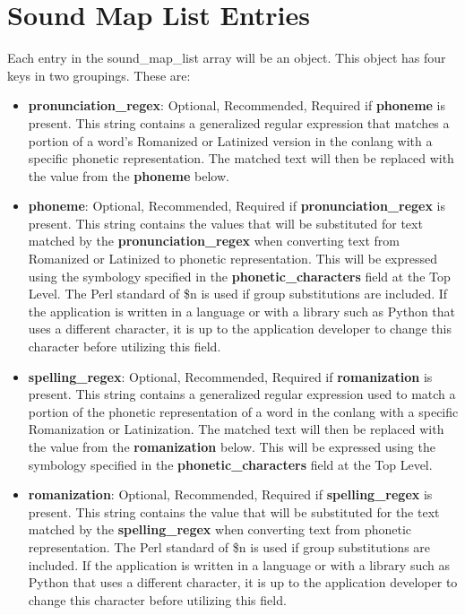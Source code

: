 \chapter{Sound Map List Entries}
Each entry in the sound\_map\_list array will be an object.  This object has four keys in two groupings.  These are:
\begin{itemize}
	\item \textbf{pronunciation\_regex}: Optional, Recommended, Required if \textbf{phoneme} is present.  This string contains a generalized regular expression that matches a portion of a word's Romanized or Latinized version in the conlang with a specific phonetic representation.  The matched text will then be replaced with the value from the \textbf{phoneme} below.
	\item \textbf{phoneme}: Optional, Recommended, Required if \textbf{pronunciation\_regex} is present.  This string contains the values that will be substituted for text matched by the \textbf{pronunciation\_regex} when converting text from Romanized or Latinized to phonetic representation.  This will be expressed using the symbology specified in the \textbf{phonetic\_characters} field at the Top Level.  The Perl standard of \$n is used if group substitutions are included.  If the application is written in a language or with a library such as Python that uses a different character, it is up to the application developer to change this character before utilizing this field.
	\item \textbf{spelling\_regex}: Optional, Recommended, Required if \textbf{romanization} is present.  This string contains a generalized regular expression used to match a portion of the phonetic representation of a word in the conlang with a specific Romanization or Latinization.  The matched text will then be replaced with the value from the \textbf{romanization} below.  This will be expressed using the symbology specified in the \textbf{phonetic\_characters} field at the Top Level.
	\item \textbf{romanization}: Optional, Recommended, Required if \textbf{spelling\_regex} is present.  This string contains the value that will be substituted for the text matched by the \textbf{spelling\_regex} when converting text from phonetic representation.  The Perl standard of \$n is used if group substitutions are included.  If the application is written in a language or with a library such as Python that uses a different character, it is up to the application developer to change this character before utilizing this field.
\end{itemize}

